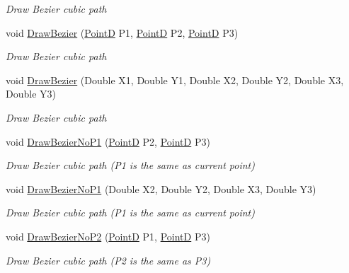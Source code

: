 \begin{DoxyCompactItemize}
\begin{DoxyCompactList}\small\item\em Draw Bezier cubic path \end{DoxyCompactList}\item 
void \hyperlink{class_pdf_file_writer_1_1_pdf_contents_adaa9472abb69fb24b4247b5344609ad0}{Draw\+Bezier} (\hyperlink{class_pdf_file_writer_1_1_point_d}{PointD} P1, \hyperlink{class_pdf_file_writer_1_1_point_d}{PointD} P2, \hyperlink{class_pdf_file_writer_1_1_point_d}{PointD} P3)
\begin{DoxyCompactList}\small\item\em Draw Bezier cubic path \end{DoxyCompactList}\item 
void \hyperlink{class_pdf_file_writer_1_1_pdf_contents_a67958163e1a6c2d5a354f47f6676d9e3}{Draw\+Bezier} (Double X1, Double Y1, Double X2, Double Y2, Double X3, Double Y3)
\begin{DoxyCompactList}\small\item\em Draw Bezier cubic path \end{DoxyCompactList}\item 
void \hyperlink{class_pdf_file_writer_1_1_pdf_contents_aaecfc2eec1929a4cb33a54640fb3fe81}{Draw\+Bezier\+No\+P1} (\hyperlink{class_pdf_file_writer_1_1_point_d}{PointD} P2, \hyperlink{class_pdf_file_writer_1_1_point_d}{PointD} P3)
\begin{DoxyCompactList}\small\item\em Draw Bezier cubic path (P1 is the same as current point) \end{DoxyCompactList}\item 
void \hyperlink{class_pdf_file_writer_1_1_pdf_contents_a7abdcddf0fb86d3a1050a0544707dbcb}{Draw\+Bezier\+No\+P1} (Double X2, Double Y2, Double X3, Double Y3)
\begin{DoxyCompactList}\small\item\em Draw Bezier cubic path (P1 is the same as current point) \end{DoxyCompactList}\item 
void \hyperlink{class_pdf_file_writer_1_1_pdf_contents_a1844148ff70a3be7fc117044a9a0707c}{Draw\+Bezier\+No\+P2} (\hyperlink{class_pdf_file_writer_1_1_point_d}{PointD} P1, \hyperlink{class_pdf_file_writer_1_1_point_d}{PointD} P3)
\begin{DoxyCompactList}\small\item\em Draw Bezier cubic path (P2 is the same as P3) \end{DoxyCompactList}\item 

\end{DoxyCompactItemize}
